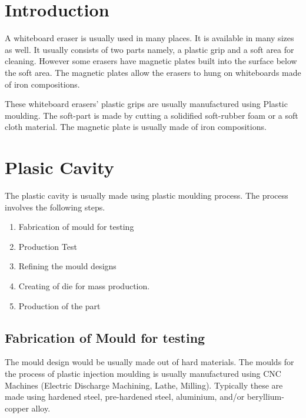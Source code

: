 \documentclass[12pt,a4paper,oneside]{article}
\begin{document}

\newpage
\tableofcontents

\newpage
\listoffigures

\newpage
\listoftables

\newpage
{}
\setcounter{page}{1}


\section{Introduction}

A whiteboard eraser is usually used in many places. It is available in many sizes as well. It usually consists of two parts namely, a plastic grip and a soft area for cleaning. However some erasers have magnetic plates built into the surface below the soft area. The magnetic plates allow the erasers to hung on whiteboards made of iron compositions. 

These whiteboard erasers’ plastic grips are usually manufactured using Plastic moulding. The soft-part is made by cutting a solidified soft-rubber foam or a soft cloth material. The magnetic plate is usually made of iron compositions. 



\newpage
\section{Plasic Cavity}

The plastic cavity is usually made using plastic moulding process. The process involves the following steps. 

\begin{enumerate}
    \item Fabrication of mould for testing
    \item Production Test
    \item Refining the mould designs
    \item Creating of die for mass production.
    \item Production of the part
\end{enumerate}


\subsection{Fabrication of Mould for testing}

The mould design would be usually made out of hard materials. The moulds for the process of plastic injection moulding is usually manufactured using CNC Machines (Electric Discharge Machining, Lathe, Milling). Typically these are made using hardened steel, pre-hardened steel, aluminium, and/or beryllium-copper alloy.
\end{document}
